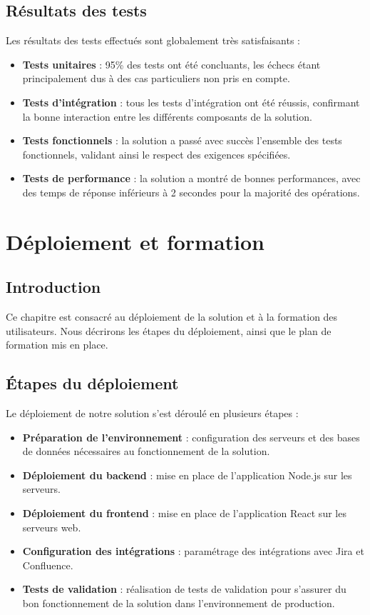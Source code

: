 \documentclass[12pt,a4paper]{report}
\begin{document}
\section{Résultats des tests}
Les résultats des tests effectués sont globalement très satisfaisants :
\begin{itemize}
    \item \textbf{Tests unitaires} : 95\% des tests ont été concluants, les échecs étant principalement dus à des cas particuliers non pris en compte.
    \item \textbf{Tests d'intégration} : tous les tests d'intégration ont été réussis, confirmant la bonne interaction entre les différents composants de la solution.
    \item \textbf{Tests fonctionnels} : la solution a passé avec succès l'ensemble des tests fonctionnels, validant ainsi le respect des exigences spécifiées.
    \item \textbf{Tests de performance} : la solution a montré de bonnes performances, avec des temps de réponse inférieurs à 2 secondes pour la majorité des opérations.
\end{itemize}

\chapter{Déploiement et formation}
\section{Introduction}
Ce chapitre est consacré au déploiement de la solution et à la formation des utilisateurs. Nous décrirons les étapes du déploiement, ainsi que le plan de formation mis en place.

\section{Étapes du déploiement}
Le déploiement de notre solution s'est déroulé en plusieurs étapes :
\begin{itemize}
    \item \textbf{Préparation de l'environnement} : configuration des serveurs et des bases de données nécessaires au fonctionnement de la solution.
    \item \textbf{Déploiement du backend} : mise en place de l'application Node.js sur les serveurs.
    \item \textbf{Déploiement du frontend} : mise en place de l'application React sur les serveurs web.
    \item \textbf{Configuration des intégrations} : paramétrage des intégrations avec Jira et Confluence.
    \item \textbf{Tests de validation} : réalisation de tests de validation pour s'assurer du bon fonctionnement de la solution dans l'environnement de production.
\end{itemize}
\end{document}

